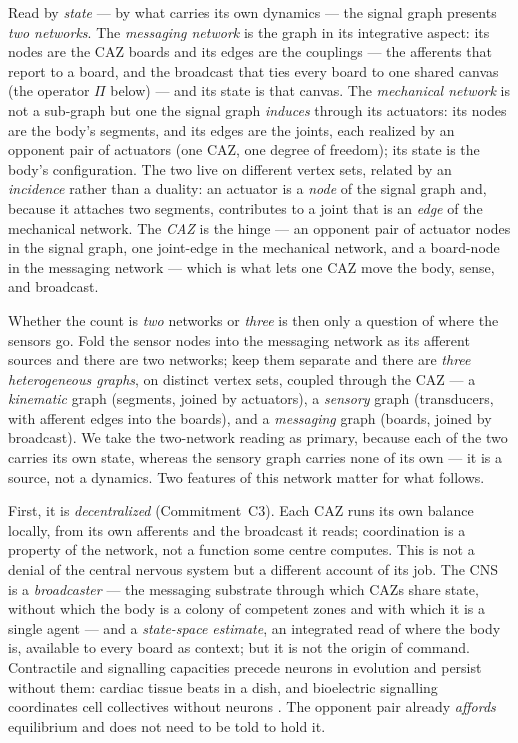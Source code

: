 \documentclass{article}
\begin{document}
Read by \emph{state} --- by what carries its own dynamics --- the signal graph
presents \emph{two networks}.  The \emph{messaging network} is the graph in its
integrative aspect: its nodes are the CAZ boards and its edges are the couplings
--- the afferents that report to a board, and the broadcast that ties every board
to one shared canvas (the operator $\Pi$ below) --- and its state is that canvas.
The \emph{mechanical network} is not a sub-graph but one the signal graph
\emph{induces} through its actuators: its nodes are the body's segments, and its
edges are the joints, each realized by an opponent pair of actuators (one CAZ, one
degree of freedom); its state is the body's configuration.  The two live on
different vertex sets, related by an \emph{incidence} rather than a duality: an
actuator is a \emph{node} of the signal graph and, because it attaches two
segments, contributes to a joint that is an \emph{edge} of the mechanical network.
The \emph{CAZ} is the hinge --- an opponent pair of actuator nodes in the signal
graph, one joint-edge in the mechanical network, and a board-node in the messaging
network --- which is what lets one CAZ move the body, sense, and broadcast.

Whether the count is \emph{two} networks or \emph{three} is then only a question
of where the sensors go.  Fold the sensor nodes into the messaging network as its
afferent sources and there are two networks; keep them separate and there are
\emph{three heterogeneous graphs}, on distinct vertex sets, coupled through the CAZ
--- a \emph{kinematic} graph (segments, joined by actuators), a \emph{sensory}
graph (transducers, with afferent edges into the boards), and a \emph{messaging}
graph (boards, joined by broadcast).  We take the two-network reading as primary, because each of the
two carries its own state, whereas the sensory graph carries none of its own --- it
is a source, not a dynamics.  Two features of this network matter for what follows.

First, it is \emph{decentralized} (Commitment~C3).  Each CAZ runs its
own balance locally, from its own afferents and the broadcast it reads;
coordination is a property of the network, not a function some centre
computes.  This is not a denial of the central nervous system but a
different account of its job.  The CNS is a \emph{broadcaster} --- the
messaging substrate through which CAZs share state, without which the
body is a colony of competent zones and with which it is a single agent
--- and a \emph{state-space estimate}, an integrated read of where the
body is, available to every board as context; but it is not the origin
of command.  Contractile and signalling capacities precede neurons in
evolution and persist without them: cardiac tissue beats in a dish, and
bioelectric signalling coordinates cell collectives without neurons
\citep{Marder2011VariabilityCompensationModulation,Levin2014MolecularBioelectricity,LevinPezzulo2017EndogenousBioelectricNetworks}.
The opponent pair already \emph{affords} equilibrium and does not need
to be told to hold it.
\end{document}
